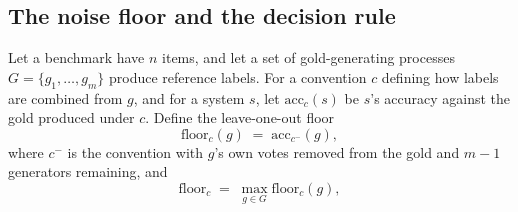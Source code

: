 \documentclass{article}
\begin{document}
\subsection{The noise floor and the decision rule}
\label{sec:loo} Let a benchmark have $n$ items, and let a set of gold-generating processes $G = \{g_1,\dots,g_m\}$ produce reference labels. For a convention $c$ defining how labels are combined from $g$, and for a system $s$, let $\mathrm{acc}_{c}(s)$ be $s$'s accuracy against the gold produced under $c$. Define the leave-one-out floor
\begin{equation} \mathrm{floor}_{c}(g) \;=\; \mathrm{acc}_{c^-}(g),
\label{eq:loo}
\end{equation} where $c^-$ is the convention with $g$'s own votes removed from the gold and $m-1$ generators remaining, and
\begin{equation} \mathrm{floor}_c \;=\; \max_{g \in G} \mathrm{floor}_c(g),
\label{eq:floormax}

\end{equation}
\end{document}
